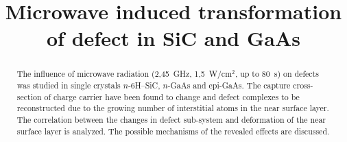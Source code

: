 \documentclass[final,3p,times,twocolumn,authoryear]{elsarticle}
\begin{document}
\begin{frontmatter}



\title{Microwave induced transformation of defect in SiC and GaAs}

%
%

\begin{abstract}
The influence of microwave radiation (2,45~GHz, 1,5~W/cm$^2$, up to 80~s) on defects was studied in single crystals $n$-6H–SiC, $n$-GaAs and epi-GaAs.
The capture cross-section of charge carrier have been found to change
and defect complexes to be reconstructed due to the growing number of  interstitial atoms in the near surface layer.
The correlation between the changes in defect sub-system and deformation of the near surface layer is analyzed.
The possible mechanisms of the revealed effects are discussed.
\end{abstract}


\end{frontmatter}
\end{document}
